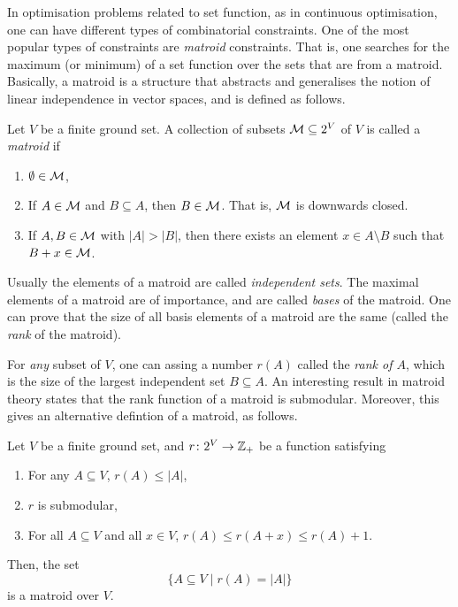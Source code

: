 In optimisation problems related to set function, as in continuous optimisation, one can have different types of combinatorial constraints. One of the most popular types of constraints are \emph{matroid} constraints. That is, one searches for the maximum (or minimum) of a set function over the sets that are from a matroid. Basically, a matroid is a structure that abstracts and generalises the notion of linear independence in vector spaces, and is defined as follows.

\begin{definition}[Matroid]
    Let $V$ be a finite ground set. A collection of subsets $\mathcal{M} \subseteq 2^V$ of $V$ is called a \emph{matroid} if 
    \begin{enumerate}
        \item $\emptyset \in \mathcal{M}$,
        \item If $A\in\mathcal{M}$ and $B \subseteq A$, then $B \in \mathcal{M}$. That is, $\mathcal{M}$ is downwards closed.
        \item If $A, B\in\mathcal{M}$ with $|A| > |B|$, then there exists an element $x\in A\setminus B$ such that $B + x \in \mathcal{M}$.
    \end{enumerate}
\end{definition}
Usually the elements of a matroid are called \emph{independent sets}. The maximal elements of a matroid are of importance, and are called \emph{bases} of the matroid. One can prove that the size of all basis elements of a matroid are the same (called the \emph{rank} of the matroid).

For \emph{any} subset of $V$, one can assing a number $r(A)$ called the \emph{rank of $A$}, which is the size of the largest independent set $B\subseteq A$. An interesting result in matroid theory states that the rank function of a matroid is submodular. Moreover, this gives an alternative defintion of a matroid, as follows.

\begin{definition} Let $V$ be a finite ground set, and $r\colon 2^V\to \mathbb{Z}_+$ be a function satisfying
    \begin{enumerate}
        \item For any $A\subseteq V$, $r(A) \leq |A|$,
        \item $r$ is submodular,
        \item For all $A\subseteq V$ and all $x\in V$, $r(A) \leq r(A+x) \leq r(A) + 1$.
    \end{enumerate}
    Then, the set 
    \[
        \{ A\subseteq V \mid r(A) = |A|\}
    \]
    is a matroid over $V$.
\end{definition}

